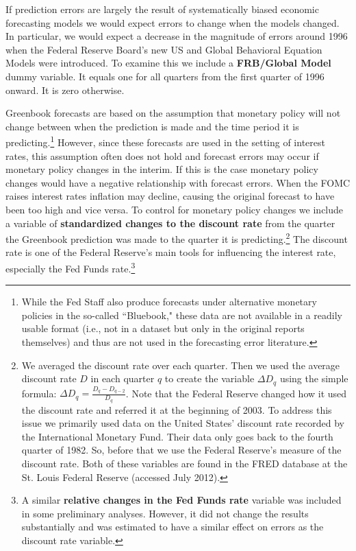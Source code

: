 \documentclass[a4paper]{article}
\begin{document}
If prediction errors are largely the result of systematically biased economic forecasting models we would expect errors to change when the models changed. In particular, we would expect a decrease in the magnitude of errors around 1996 when the Federal Reserve Board's new US and Global Behavioral Equation Models were introduced. To examine this we include a {\bf{FRB/Global Model}} dummy variable. It equals one for all quarters from the first quarter of 1996 onward. It is zero otherwise.

Greenbook forecasts are based on the assumption that monetary policy will not change between when the prediction is made and the time period it is predicting.\footnote{While the Fed Staff also produce forecasts under alternative monetary policies in the so-called ``Bluebook," these data are not available in a readily usable format (i.e., not in a dataset but only in the original reports themselves) and thus are not used in the forecasting error literature.} However, since these forecasts are used in the setting of interest rates, this assumption often does not hold and forecast errors may occur if monetary policy changes in the interim. If this is the case monetary policy changes would have a negative relationship with forecast errors. When the FOMC raises interest rates inflation may decline, causing the original forecast to have been too high and vice versa. To control for monetary policy changes we include a variable of {\bf{standardized changes to the discount rate}} from the quarter the Greenbook prediction was made to the quarter it is predicting.\footnote{We averaged the discount rate over each quarter. Then we used the average discount rate $D$ in each quarter $q$ to create the variable $\Delta D_{q}$ using the simple formula: $\Delta D_{q} = \frac{D_{q} - D_{q-2}}{D_{q}}$. Note that the Federal Reserve changed how it used the discount rate and referred it at the beginning of 2003. To address this issue we primarily used data on the United States' discount rate recorded by the International Monetary Fund. Their data only goes back to the fourth quarter of 1982. So, before that we use the Federal Reserve's measure of the discount rate. Both of these variables are found in the FRED database at the St. Louis Federal Reserve (accessed July 2012). } The discount rate is one of the Federal Reserve's main tools for influencing the interest rate, especially the Fed Funds rate.\footnote{A similar {\bf{relative changes in the Fed Funds rate}} variable was included in some preliminary analyses. However, it did not change the results substantially and was estimated to have a similar effect on errors as the discount rate variable.}
\end{document}

